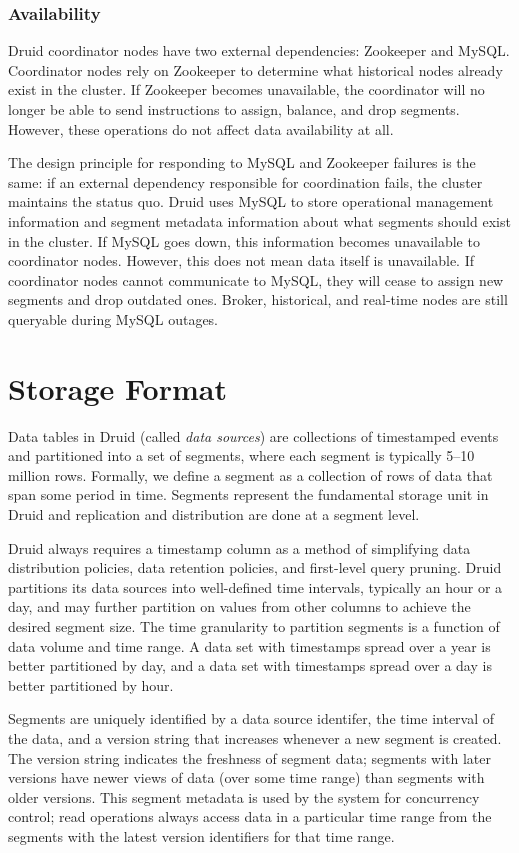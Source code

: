 \documentclass{acm_proc_article-sp}
\begin{document}
\subsubsection{Availability}
Druid coordinator nodes have two external dependencies: Zookeeper and MySQL.
Coordinator nodes rely on Zookeeper to determine what historical nodes already
exist in the cluster. If Zookeeper becomes unavailable, the coordinator will no
longer be able to send instructions to assign, balance, and drop segments.
However, these operations do not affect data availability at all.

The design principle for responding to MySQL and Zookeeper failures is the
same: if an external dependency responsible for coordination fails, the cluster
maintains the status quo. Druid uses MySQL to store operational management
information and segment metadata information about what segments should exist
in the cluster.  If MySQL goes down, this information becomes unavailable to
coordinator nodes. However, this does not mean data itself is unavailable. If
coordinator nodes cannot communicate to MySQL, they will cease to assign new
segments and drop outdated ones. Broker, historical, and real-time nodes are still
queryable during MySQL outages.

\section{Storage Format}
\label{sec:storage-format}
Data tables in Druid (called \emph{data sources}) are collections of
timestamped events and partitioned into a set of segments, where each segment
is typically 5--10 million rows. Formally, we define a segment as a collection
of rows of data that span some period in time. Segments represent the
fundamental storage unit in Druid and replication and distribution are done at
a segment level.
 
Druid always requires a timestamp column as a method of simplifying data
distribution policies, data retention policies, and first-level query pruning.
Druid partitions its data sources into well-defined time intervals, typically
an hour or a day, and may further partition on values from other columns to
achieve the desired segment size. The time granularity
to partition segments is a function of data volume and time range. A data set
with timestamps spread over a year is better partitioned by day, and a data set
with timestamps spread over a day is better partitioned by hour.

Segments are uniquely identified by a data source identifer, the time interval
of the data, and a version string that increases whenever a new segment is
created.  The version string indicates the freshness of segment data; segments
with later versions have newer views of data (over some time range) than
segments with older versions.  This segment metadata is used by the system for
concurrency control; read operations always access data in a particular time
range from the segments with the latest version identifiers for that time
range.
\end{document}
